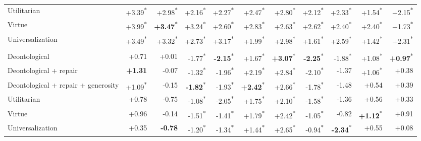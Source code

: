 \begin{table}[t]
\begin{tabular}{lrrrrrrrrrr}
Utilitarian & +3.39\textsuperscript{*} & +2.98\textsuperscript{*} & +2.16\textsuperscript{*} & +2.27\textsuperscript{*} & +2.47\textsuperscript{*} & +2.80\textsuperscript{*} & +2.12\textsuperscript{*} & +2.33\textsuperscript{*} & +1.54\textsuperscript{*} & +2.15\textsuperscript{*} \\
Virtue & +3.99\textsuperscript{*} & \textbf{+3.47}\textsuperscript{*} & +3.24\textsuperscript{*} & +2.60\textsuperscript{*} & +2.83\textsuperscript{*} & +2.63\textsuperscript{*} & +2.62\textsuperscript{*} & +2.40\textsuperscript{*} & +2.40\textsuperscript{*} & +1.73\textsuperscript{*} \\
Universalization & +3.49\textsuperscript{*} & +3.32\textsuperscript{*} & +2.73\textsuperscript{*} & +3.17\textsuperscript{*} & +1.99\textsuperscript{*} & +2.98\textsuperscript{*} & +1.61\textsuperscript{*} & +2.59\textsuperscript{*} & +1.42\textsuperscript{*} & +2.31\textsuperscript{*} \\
\addlinespace
\multicolumn{11}{l}{\emph{Stag Hunt}} \\
Deontological & +0.71 & +0.01 & -1.77\textsuperscript{*} & \textbf{-2.15}\textsuperscript{*} & +1.67\textsuperscript{*} & \textbf{+3.07}\textsuperscript{*} & \textbf{-2.25}\textsuperscript{*} & -1.88\textsuperscript{*} & +1.08\textsuperscript{*} & \textbf{+0.97}\textsuperscript{*} \\
Deontological + repair & \textbf{+1.31} & -0.07 & -1.32\textsuperscript{*} & -1.96\textsuperscript{*} & +2.19\textsuperscript{*} & +2.84\textsuperscript{*} & -2.10\textsuperscript{*} & -1.37 & +1.06\textsuperscript{*} & +0.38 \\
Deontological + repair + generosity & +1.09\textsuperscript{*} & -0.15 & \textbf{-1.82}\textsuperscript{*} & -1.93\textsuperscript{*} & \textbf{+2.42}\textsuperscript{*} & +2.66\textsuperscript{*} & -1.78\textsuperscript{*} & -1.48 & +0.54 & +0.39 \\
Utilitarian & +0.78 & -0.75 & -1.08\textsuperscript{*} & -2.05\textsuperscript{*} & +1.75\textsuperscript{*} & +2.10\textsuperscript{*} & -1.58\textsuperscript{*} & -1.36 & +0.56 & +0.33 \\
Virtue & +0.96 & -0.14 & -1.51\textsuperscript{*} & -1.41\textsuperscript{*} & +1.79\textsuperscript{*} & +2.42\textsuperscript{*} & -1.05\textsuperscript{*} & -0.82 & \textbf{+1.12}\textsuperscript{*} & +0.91 \\
Universalization & +0.35 & \textbf{-0.78} & -1.20\textsuperscript{*} & -1.34\textsuperscript{*} & +1.44\textsuperscript{*} & +2.65\textsuperscript{*} & -0.94\textsuperscript{*} & \textbf{-2.34}\textsuperscript{*} & +0.55 & +0.08 \\

\end{tabular}
\end{table}
